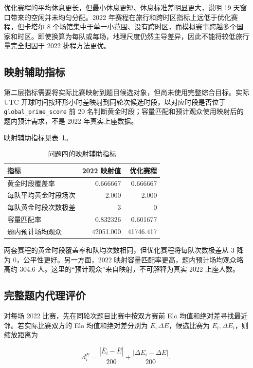 优化赛程的平均休息更长，但最小休息更短、休息标准差明显更大，说明 19 天窗口带来的空闲并未均匀分配。2022 年赛程在旅行和跨时区指标上远低于优化赛程，但卡塔尔 8 个场馆集中于单一小范围、没有跨时区，而模拟赛事跨越多个国家和时区。即使换算为每队或每场，地理尺度仍然主导差异，因此不能将较低旅行量完全归因于 2022 排程方法更优。

\subsection{映射辅助指标}

第二层指标需要将实际比赛映射到题目候选对象，但尚未使用完整综合目标。实际 UTC 开球时间按环形小时差映射到同轮次候选时段，以对应时段是否位于 \texttt{global\_prime\_score} 前 20 名判断黄金时段；容量匹配和预计观众使用映射后的题内预计需求，不是 2022 年真实上座数据。

映射辅助指标见表~\ref{tab:q4-auxiliary}。

\begin{longtable}[]{@{}lrr@{}}
\caption{问题四的映射辅助指标}\label{tab:q4-auxiliary}\\
\toprule\noalign{}
指标 & 2022 映射值 & 优化赛程 \\
\midrule\noalign{}
\endhead
\bottomrule\noalign{}
\endlastfoot
黄金时段覆盖率 & 0.666667 & 0.666667 \\
每队平均黄金时段场次 & 2.000 & 2.000 \\
每队黄金时段次数极差 & 3 & 0 \\
容量匹配率 & 0.832326 & 0.601677 \\
题内预计场均观众 & 42051.000 & 41746.417 \\
\end{longtable}

两套赛程的黄金时段覆盖率和队均次数相同，但优化赛程将每队次数极差从 3 降为 0，公平性更好。另一方面，2022 映射容量匹配率更高，题内预计场均观众略高约 304.6 人。这里的``预计观众''来自映射，不可解释为真实 2022 上座人数。

\subsection{完整题内代理评价}

对每场 2022 比赛，先在同轮次题目比赛中按双方赛前 Elo 均值和绝对差寻找最近邻。若实际比赛双方的 Elo 均值和绝对差分别为 $\bar E,\Delta E$，候选比赛为 $\bar E_i,\Delta E_i$，则缩放距离为

\[
d_i^{E}=\frac{|\bar E_i-\bar E|}{200}
+\frac{|\Delta E_i-\Delta E|}{200}.
\]

